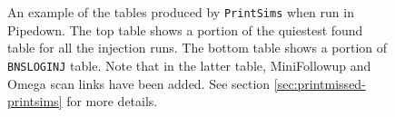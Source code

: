 \begin{figure}[p]
\center
{}
\label{fig:sample-printsims}
\caption{An example of the tables produced by \texttt{PrintSims} when run in
Pipedown. The top table shows a portion of the quiestest found table for all
the injection runs. The bottom table shows a portion of \texttt{BNSLOGINJ}
table. Note that in the latter table, MiniFollowup and Omega scan links have
been added. See section \ref{sec:printmissed-printsims} for more details.}
\end{figure}

